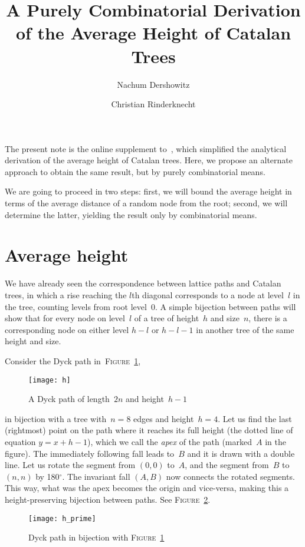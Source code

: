 \documentclass[11pt]{article}
\title{A Purely Combinatorial Derivation of the Average Height of
  Catalan Trees}
\author{Nachum Dershowitz \and Christian Rinderknecht}
\date{}
\newcommand\fig{\textsc{Figure}}
\newcommand\Fig{\textsc{Figure}}
\begin{document}
\maketitle

The present note is the online supplement
to~\cite{DershowitzRinderknecht:2015}, which simplified the analytical
derivation of the average height of Catalan trees. Here, we propose an
alternate approach to obtain the same result, but by purely
combinatorial means.

We are going to proceed in two steps: first, we will bound the average
height in terms of the average distance of a random node from the
root; second, we will determine the latter, yielding the result only
by combinatorial means.

\section{Average height}

We have already seen the correspondence between lattice paths and
Catalan trees, in which a rise reaching the $l$th diagonal corresponds
to a node at level~$l$ in the tree, counting levels from root
level~$0$.  A simple bijection between paths will show that for every
node on level~$l$ of a tree of height~$h$ and size~$n$, there is a
corresponding node on either level $h-l$ or $h-l-1$ in another tree of
the same height and size.

Consider the Dyck path in~\Fig~\ref{fig:h},
\begin{figure}
\centering
\texttt{[image: h]}
\caption{A Dyck path of length~\(2n\) and height~\(h-1\)\label{fig:h}}
\end{figure}
in bijection with a tree with~\(n=8\) edges and height~\(h=4\). Let us
find the last (rightmost) point on the path where it reaches its full
height (the dotted line of equation \(y = x + h - 1\)), which we call
the \emph{apex} of the path (marked~$A$ in the figure).  The
immediately following fall leads to~$B$ and it is drawn with a double
line. Let us rotate the segment from $(0,0)$ to~$A$, and the segment
from~$B$ to~$(n,n)$ by 180$^\circ$. The invariant fall $(A,B)$ now
connects the rotated segments. This way, what was the apex becomes the
origin and vice\hyp{}versa, making this a height\hyp{}preserving
bijection between paths. See \fig~\ref{fig:h_prime}.
\begin{figure}[!t]
\centering
\texttt{[image: h\_prime]}
\caption{Dyck path in bijection with \fig~\ref{fig:h}
\label{fig:h_prime}}
\end{figure}
\end{document}
